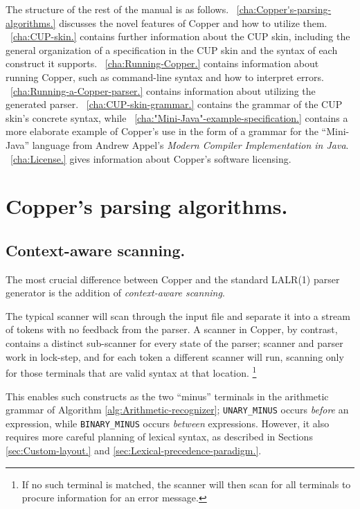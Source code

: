 \documentclass[12pt,english,twoside]{report}
\newcommand\sectionname{Section}
\begin{document}
The structure of the rest of the manual is as follows.
%
\chaptername~\ref{cha:Copper's-parsing-algorithms.} discusses the
novel features of Copper and how to utilize them.
%
\chaptername~\ref{cha:CUP-skin.} contains further information about
the CUP skin, including the general organization of a specification
in the CUP skin and the syntax of each construct it supports.
%
\chaptername~\ref{cha:Running-Copper.} contains information about
running Copper, such as command-line syntax and how to interpret
errors.
%
\chaptername~\ref{cha:Running-a-Copper-parser.} contains
information about utilizing the generated parser.
%
\appendixname~\ref{cha:CUP-skin-grammar.} contains the grammar of the
CUP skin's concrete syntax,
%
while \appendixname ~\ref{cha:"Mini-Java"-example-specification.}
contains a more elaborate example of Copper's use in the form of a
grammar for the {}``Mini-Java'' language from Andrew Appel's
\emph{Modern Compiler Implementation in Java}.
%
\appendixname~\ref{cha:License.} gives information about Copper's
software licensing.


\chapter{\label{cha:Copper's-parsing-algorithms.}Copper's parsing algorithms.}


\section{Context-aware scanning.}

The most crucial difference between Copper and the standard LALR(1)
parser generator is the addition of \emph{context-aware scanning}.

The typical scanner will scan through the input file and separate
it into a stream of tokens with no feedback from the parser. A scanner
in Copper, by contrast, contains a distinct sub-scanner for every
state of the parser; scanner and parser work in lock-step, and for
each token a different scanner will run, scanning only for those terminals
that are valid syntax at that location.%
\footnote{If no such terminal is matched, the scanner will then scan for all
terminals to procure information for an error message.%
}

This enables such constructs as the two {}``minus'' terminals in
the arithmetic grammar of Algorithm \ref{alg:Arithmetic-recognizer};
\texttt{UNARY\_MINUS} occurs \emph{before} an expression, while \texttt{BINARY\_MINUS}
occurs \emph{between} expressions. However, it also requires more
careful planning of lexical syntax, as described in \sectionname{}s
\ref{sec:Custom-layout.} and \ref{sec:Lexical-precedence-paradigm.}.
\end{document}

